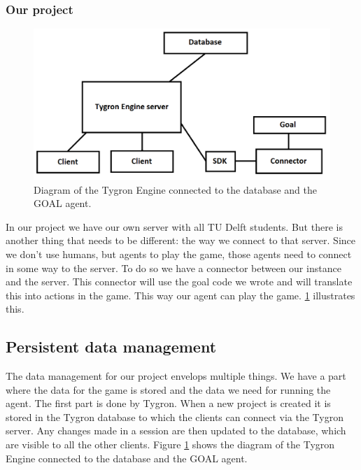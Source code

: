 \subsubsection{Our project}
\begin{figure}[h!]
  \centering
  \includegraphics[scale=0.35]{Tygrondatabase.png}
  \caption{Diagram of the Tygron Engine connected to the database and the GOAL agent.}
  \label{fig:tygron2}
\end{figure}
In our project we have our own server with all TU Delft students. But there is another thing that needs to be different: the way we connect to that server. Since we don't use humans, but agents to play the game, those agents need to connect in some way to the server. To do so we have a connector between our instance and the server. This connector will use the goal code we wrote and will translate this into actions in the game. This way our agent can play the game. \ref{fig:tygron2} illustrates this.

\newpage
\subsection{Persistent data management}
The data management for our project envelops multiple things. We have a part where the data for the game is stored and the data we need for running the agent. The first part is done by Tygron. When a new project is created it is stored in the Tygron database to which the clients can connect via the Tygron server. Any changes made in a session are then updated to the database, which are visible to all the other clients. Figure \ref{fig:tygron2} shows the diagram of the Tygron Engine connected to the database and the GOAL agent.

